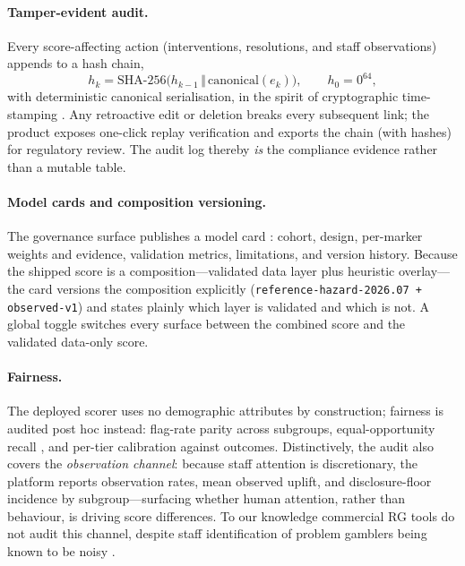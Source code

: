 \documentclass[11pt]{article}
\newcommand{\version}{reference-hazard-2026.07}
\begin{document}
\paragraph{Tamper-evident audit.} Every score-affecting action (interventions,
resolutions, and staff observations) appends to a hash chain,
\begin{equation}
  h_k = \mathrm{SHA\text{-}256}\big(h_{k-1} \,\Vert\, \mathrm{canonical}(e_k)\big),
  \qquad h_0 = 0^{64},
\end{equation}
with deterministic canonical serialisation, in the spirit of cryptographic
time-stamping \citep{haber1991}. Any retroactive edit or deletion breaks every
subsequent link; the product exposes one-click replay verification and exports the
chain (with hashes) for regulatory review. The audit log thereby \emph{is} the
compliance evidence rather than a mutable table.

\paragraph{Model cards and composition versioning.} The governance surface publishes a
model card \citep{mitchell2019}: cohort, design, per-marker weights and evidence,
validation metrics, limitations, and version history. Because the shipped score is a
composition---validated data layer plus heuristic overlay---the card versions the
composition explicitly (\texttt{\version{} + observed-v1}) and states plainly which
layer is validated and which is not. A global toggle switches every surface between the
combined score and the validated data-only score.

\paragraph{Fairness.}\label{sec:fairness} The deployed scorer uses no demographic
attributes by construction; fairness is audited post hoc instead: flag-rate parity
across subgroups, equal-opportunity recall \citep{hardt2016}, and per-tier calibration
against outcomes. Distinctively, the audit also covers the \emph{observation channel}:
because staff attention is discretionary, the platform reports observation rates, mean
observed uplift, and disclosure-floor incidence by subgroup---surfacing whether human
attention, rather than behaviour, is driving score differences. To our knowledge
commercial RG tools do not audit this channel, despite staff identification of problem
gamblers being known to be noisy \citep{delfabbro2012}.
\end{document}
